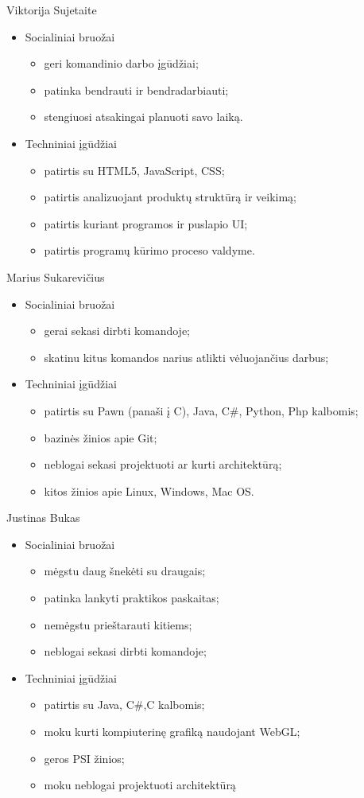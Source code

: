 \documentclass[11pt]{article}
\begin{document}
	Viktorija Sujetaite
	\begin{itemize}
		\item Socialiniai bruožai
		\begin{itemize}
			\item geri komandinio darbo įgūdžiai;
			\item patinka bendrauti ir bendradarbiauti;
			\item stengiuosi atsakingai planuoti savo laiką.
		\end{itemize}
		\item Techniniai įgūdžiai
		\begin{itemize}
			\item patirtis su HTML5, JavaScript, CSS;
			\item patirtis analizuojant produktų struktūrą ir veikimą;
			\item patirtis kuriant programos ir puslapio UI;
			\item patirtis programų kūrimo proceso valdyme.
		\end{itemize}
	\end{itemize}
	Marius Sukarevičius
	\begin{itemize}
		\item Socialiniai bruožai
		\begin{itemize}
			\item gerai sekasi dirbti komandoje;
			\item skatinu kitus komandos narius atlikti vėluojančius darbus;
		\end{itemize}
		\item Techniniai įgūdžiai
		\begin{itemize}
			\item patirtis su Pawn (panaši į C), Java, C\#, Python, Php kalbomis;
			\item bazinės žinios apie Git;
			\item neblogai sekasi projektuoti ar kurti architektūrą;
			\item kitos žinios apie Linux, Windows, Mac OS.
		\end{itemize}
	\end{itemize}
	Justinas Bukas
	\begin{itemize}
		\item Socialiniai bruožai
		\begin{itemize}
			\item mėgstu daug šnekėti su draugais;
			\item patinka lankyti praktikos paskaitas;
			\item nemėgstu prieštarauti kitiems;
			\item neblogai sekasi dirbti komandoje;
		\end{itemize}
		\item Techniniai įgūdžiai
		\begin{itemize}
			\item patirtis su Java, C\#,C kalbomis;
			\item moku kurti kompiuterinę grafiką naudojant WebGL;
			\item geros PSI žinios;
			\item moku neblogai projektuoti architektūrą
			
		\end{itemize}
	\end{itemize}
\end{document}

